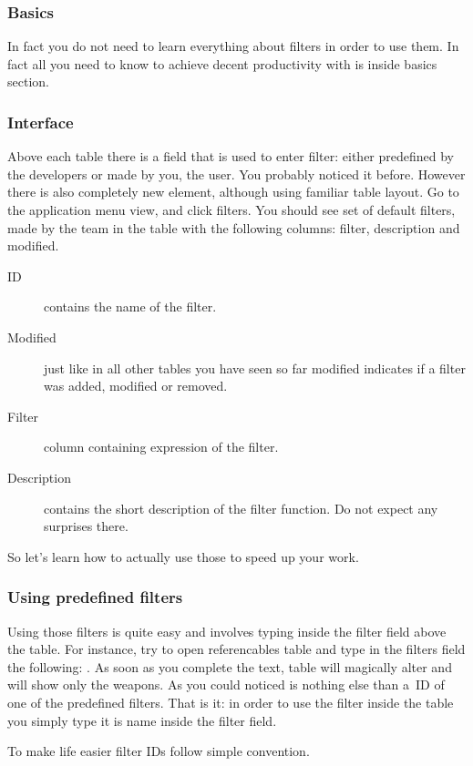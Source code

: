 \subsubsection{Basics}
In fact you do not need to learn everything about filters in order to use them. In fact all you need to know to achieve decent productivity
with \OCS{} is inside basics section.

\subsubsection{Interface}
Above each table there is a field that is used to enter filter: either predefined by the \OMW{} developers or made by you, the user. You probably noticed it before. However there is also completely new element, although using familiar table layout. Go to the application menu view, and click filters. You should see set of default filters, made by the \OMW{} team in the table with the following columns: filter, description and modified.

\begin{description}
 \item[ID] contains the name of the filter.
 \item[Modified] just like in all other tables you have seen so far modified indicates if a filter was added, modified or removed.
 \item[Filter] column containing expression of the filter.
 \item[Description] contains the short description of the filter function. Do not expect any surprises there.
\end{description}

So let's learn how to actually use those to speed up your work.
\subsubsection{Using predefined filters}
Using those filters is quite easy and involves typing inside the filter field above the table. For instance, try to open referencables table and type in the filters field the following: . As soon as you complete the text, table will magically alter and will show only the weapons. As you could noticed  is nothing else than a~ID of one of the predefined filters. That is it: in order to use the filter inside the table you simply type it is name inside the filter field.

To make life easier filter IDs follow simple convention.

